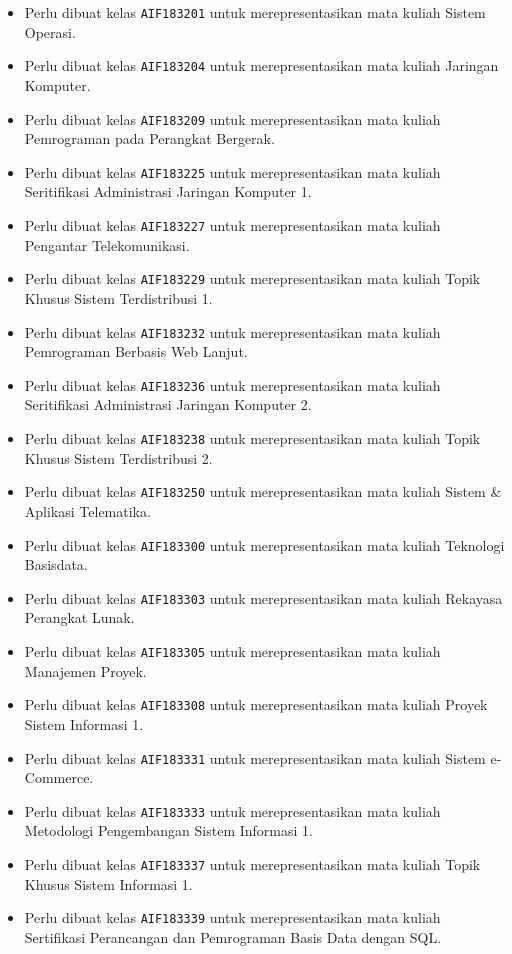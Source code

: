 \begin{enumerate}
\begin{itemize}
		\item Perlu dibuat kelas \texttt{AIF183201} untuk merepresentasikan mata kuliah Sistem Operasi.
		\item Perlu dibuat kelas \texttt{AIF183204} untuk merepresentasikan mata kuliah Jaringan Komputer.
		\item Perlu dibuat kelas \texttt{AIF183209} untuk merepresentasikan mata kuliah Pemrograman pada Perangkat Bergerak.
		\item Perlu dibuat kelas \texttt{AIF183225} untuk merepresentasikan mata kuliah Seritifikasi Administrasi Jaringan Komputer 1.
		\item Perlu dibuat kelas \texttt{AIF183227} untuk merepresentasikan mata kuliah Pengantar Telekomunikasi.
		\item Perlu dibuat kelas \texttt{AIF183229} untuk merepresentasikan mata kuliah Topik Khusus Sistem Terdistribusi 1.
		\item Perlu dibuat kelas \texttt{AIF183232} untuk merepresentasikan mata kuliah Pemrograman Berbasis Web Lanjut.
		\item Perlu dibuat kelas \texttt{AIF183236} untuk merepresentasikan mata kuliah Seritifikasi Administrasi Jaringan Komputer 2.
		\item Perlu dibuat kelas \texttt{AIF183238} untuk merepresentasikan mata kuliah Topik Khusus Sistem Terdistribusi 2.
		\item Perlu dibuat kelas \texttt{AIF183250} untuk merepresentasikan mata kuliah Sistem \& Aplikasi Telematika.
		\item Perlu dibuat kelas \texttt{AIF183300} untuk merepresentasikan mata kuliah Teknologi Basisdata.
		\item Perlu dibuat kelas \texttt{AIF183303} untuk merepresentasikan mata kuliah Rekayasa Perangkat Lunak.
		\item Perlu dibuat kelas \texttt{AIF183305} untuk merepresentasikan mata kuliah Manajemen Proyek.
		\item Perlu dibuat kelas \texttt{AIF183308} untuk merepresentasikan mata kuliah Proyek Sistem Informasi 1.
		\item Perlu dibuat kelas \texttt{AIF183331} untuk merepresentasikan mata kuliah Sistem e-Commerce.
		\item Perlu dibuat kelas \texttt{AIF183333} untuk merepresentasikan mata kuliah Metodologi Pengembangan Sistem Informasi 1.
		\item Perlu dibuat kelas \texttt{AIF183337} untuk merepresentasikan mata kuliah Topik Khusus Sistem Informasi 1.
		\item Perlu dibuat kelas \texttt{AIF183339} untuk merepresentasikan mata kuliah Sertifikasi Perancangan dan Pemrograman Basis Data dengan SQL.

\end{itemize}
\end{enumerate}
